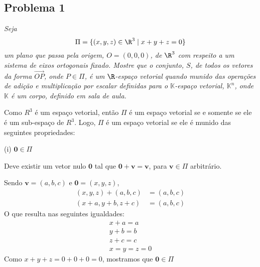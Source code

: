 \subsection*{Problema 1}
\textit{Seja
\[
\Pi = \{ ( x , y , z ) \in \R^3 \mid x + y + z  = 0 \}
\] 
um plano que passa pela origem,  $O = (0,0,0)$, de $\R^3$ com respeito a um sistema de eixos ortogonais fixado. Mostre  que o conjunto, $S$, de todos os vetores da  forma $\overrightarrow{OP}$, onde $P \in \Pi$, é  um $\R$-espaço  vetorial quando  munido das  operações de  adição e multiplicação  por   escalar  definidas  para   o  $\mathbb{K}$-espaço vetorial, $\mathbb{K}^n$,  onde $\mathbb{K}$  é um corpo,  definido em sala de aula.}

Como ${R}^3$ é um espaço vetorial, então $\Pi$ é um espaço vetorial se e somente se ele é um sub-espaço de ${R}^3$. Logo, $\Pi$ é um espaço vetorial se ele é munido das seguintes propriedades:









(i) $\bm{0} \in \Pi$

Deve existir um vetor nulo $\bm{0}$ tal que $\bm{0} + \bm{v} = \bm{v}$, para $\bm{v} \in \Pi$ arbitrário. 

Sendo $\bm{v} = (a, b, c)$ e $\bm{0} = (x, y, z)$,
    \begin{align*}
    (x, y, z) + (a, b, c) & = (a, b, c) \tag{EV-A3} \\
    (x + a, y + b, z + c) &= (a, b, c) \tag{EV-A}
    \end{align*}
O que resulta nas seguintes igualdades:
    \begin{align*}
    x + a = a \\
    y + b = b \\
    z + c = c  \\
    x = y = z = 0
    \end{align*}
Como $x + y + z = 0 + 0 + 0 = 0$, mostramos que $\bm{0} \in \Pi$ \\

